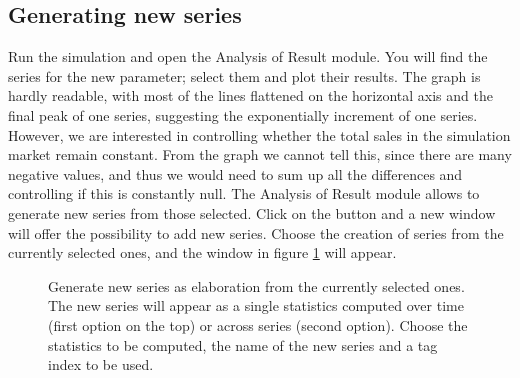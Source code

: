 \documentclass [11pt,a4paper] {book}
\begin{document}
\subsection{Generating new series} 
Run the simulation and open the Analysis of Result module. You will find the series for the new parameter; select them and plot their results. The graph is hardly readable, with most of the lines flattened on the horizontal axis and the final peak of one series, suggesting the exponentially increment of one series. However, we are interested in controlling whether the total sales in the simulation market remain constant. From the graph we cannot tell this, since there are many negative values, and thus we would need to sum up all the differences and controlling if this is constantly null. The Analysis of Result module allows to generate new series from those selected. Click on the button  and a new window will offer the possibility to add new series. Choose the creation of series from the currently selected ones, and the window in figure \ref{fig:elab} will appear.

\begin{figure}[ht]
  \centering
  \caption{\small Generate new series as elaboration from the currently selected ones. The new series will appear as a single statistics computed over time (first option on the top) or across series (second option). Choose the statistics to be computed, the name of the new series and a tag index to be used.}
   \label{fig:elab}
\end{figure}
\end{document}
